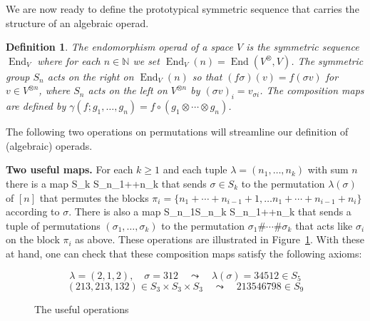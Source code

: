 \documentclass[fleqn, a4paper, twoside]{article}
\makeatletter
\newcommand{\0}{\langle 0\rangle}
\newcommand{\End}{\operatorname{End}}
\let\[\@undefined
\DeclareRobustCommand{\[}{\begin{equation}}%
\let\]\@undefined
\DeclareRobustCommand{\]}{\end{equation}}%
\theoremstyle{mytheorem}
\theoremstyle{introthm}
\theoremstyle{mydefinition}
\newtheorem{definition}[theorem]{Definition}
\theoremstyle{mydefinition2}
\theoremstyle{plain} %
\newcommand{\?}{\,?\,}
\newcommand{\NN}{\mathbb N}
\theoremstyle{mytheorem}
\theoremstyle{plain} %
\makeatother
\begin{document}
We are now ready to define the prototypical symmetric
 sequence that carries the structure of an algebraic 
 operad. 
 
\begin{definition}
The \emph{endomorphism operad} of a space $V$ is the symmetric sequence $\End_V$
where for each $n\in\NN$ we set $\End_V(n) = \End(V^\otimes, V)$. 
The symmetric group $S_n$ acts on the right
on $\End_V(n)$ 
so that $(f\sigma)(v) = f(\sigma v)$ for
$v\in V^{\otimes n}$, where $S_n$ acts on
the left on $V^{\otimes n}$ by $(\sigma v)_i
= v_{\sigma i}$. The composition maps are defined
by $\gamma(f;g_1,\ldots,g_n) = f\circ (g_1\otimes\cdots \otimes g_n)$. 
\end{definition}

The following two operations on permutations 
will streamline our definition of (algebraic)
operads.

\medskip

\textbf{Two useful maps.} For each $k\geqslant 1$
and each tuple $\lambda = (n_1,\ldots,n_k)$ 
with sum $n$
there is a map
\[ S_k \longrightarrow S_{n_1+\cdots+n_k} \]
that sends $\sigma\in S_k$ to the permutation
$\lambda(\sigma)$ of $[n]$ that permutes the blocks 
$\pi_i = \{n_1+\cdots+n_{i-1}+1,\ldots
			n_1+\cdots+n_{i-1}+n_i\}$
			according to $\sigma$.
There is also a map
\[S_{n_1}\times \cdots \times  S_{n_k} 
	\longrightarrow S_{n_1+\cdots+n_k}  \] 
	that sends a tuple of permutations 
	$(\sigma_1,\ldots,\sigma_k)$ to the
	permutation $\sigma_1\#\cdots \# \sigma_k$
	that acts like $\sigma_i$ on the block $\pi_i$
	as above. These operations are illustrated
	in Figure~\ref{fig:1}. With these at hand, 
one can check that these composition maps
satisfy the following axioms:

\begin{figure}
$$\lambda = (2,1,2), \quad \sigma = 312
	\quad \leadsto \quad \lambda(\sigma) =  34512 \in S_5
	$$
	$$
	(213,213,132)\in S_3\times S_3\times S_3 \quad \leadsto \quad 213546798\in S_9 $$
\caption{The useful operations}
\label{fig:1}
\end{figure}
\end{document}

